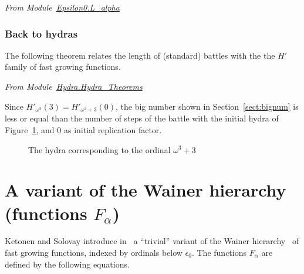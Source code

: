 \noindent
\emph{From Module~\href{../theories/html/hydras.Epsilon0.L_alpha.html\#H'_L_}{Epsilon0.L\_alpha}}


 
\subsubsection{Back to hydras}

The following theorem relates the length of (standard) battles with the the $H'$ family of fast growing functions.

\vspace{4pt}

\noindent
\emph{From Module~\href{../theories/html/hydras.Hydra.Hydra_Theorems.html}{Hydra.Hydra\_Theorems}}




Since $H'_{\omega^3}(3)= H'_{\omega^3+3}(0)$, the big number shown in Section~\vref{sect:bignum} is less or equal than 
the number of steps of the battle with the initial hydra of
Figure~\ref{fig:start}, and  $0$ as initial replication factor.

\begin{figure}[h]
  \centering

  \caption{The hydra corresponding to the ordinal $\omega^3+3$}
  \label{fig:start}
\end{figure}




\section{A variant of the Wainer hierarchy (functions \texorpdfstring{$F_\alpha$}{F\_alpha})}
\label{sect:wainer}


Ketonen and Solovay introduce in~\cite{KS81} a ``trivial'' variant of the Wainer hierarchy~\cite{BW85, Wainer1970} of fast growing functions, indexed by ordinals below $\epsilon_0$.
The functions $F_\alpha$ are defined by the following equations.

